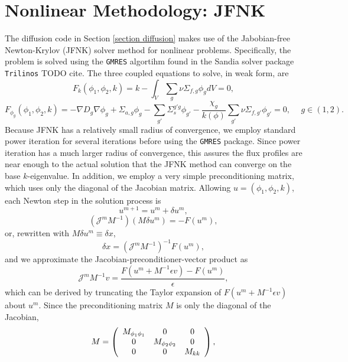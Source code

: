 \section{Nonlinear Methodology: JFNK}
The diffusion code in Section \ref{section diffusion} makes use of the Jabobian-free Newton-Krylov (JFNK) solver method for nonlinear problems.  Specifically, the problem is solved using the \texttt{GMRES} algortihm found in the Sandia solver package \texttt{Trilinos} TODO cite.  The three coupled equations to solve, in weak form, are
\begin{equation}
F_k(\phi_1,\phi_2,k)=k-\int_V \sum_g \nu\Sigma_{f,g}\phi_g dV=0,
\end{equation} \nobreak
\begin{equation}
F_{\phi_g}(\phi_1,\phi_2,k)=-\nabla D_g\nabla\phi_g+\Sigma_{a,g}\phi_g - \sum_{g'}\Sigma_s^{g'g}\phi_{g'}-\frac{\chi_g}{k(\phi)}\sum_{g'}\nu\Sigma_{f,g'}\phi_{g'}=0, \hspace{15pt}g\in(1,2).
\end{equation}
Because JFNK has a relatively small radius of convergence, we employ standard power iteration for several iterations before using the \texttt{GMRES} package.  Since power iteration has a much larger radius of convergence, this assures the flux profiles are near enough to the actual solution that the JFNK method can converge on the base $k$-eigenvalue.  In addition, we employ a very simple preconditioning matrix, which uses only the diagonal of the Jacobian matrix.  Allowing $u=(\phi_1,\phi_2,k)$, each Newton step in the solution process is
\begin{equation}
u^{m+1}=u^m+\delta u^m,
\end{equation}
\begin{equation}
(\mathcal{J}^mM^{-1})(M\delta u^m)=-F(u^m),
\end{equation}
or, rewritten with $M\delta u^m\equiv\delta x$,
\begin{equation}
\delta x=(\mathcal{J}^mM^{-1})^{-1}F(u^m),
\end{equation}
and we approximate the Jacobian-preconditioner-vector product as
\begin{equation}
\mathcal{J}^mM^{-1}v=\frac{F(u^m+M^{-1}\epsilon v)-F(u^m)}{\epsilon},
\end{equation}
which can be derived by truncating the Taylor expansion of $F(u^m+M^{-1}\epsilon v)$ about $u^m$.  Since the preconditioning matrix $M$ is only the diagonal of the Jacobian,
\begin{equation}
M=\left(\begin{array}{c c c}
M_{\phi_1\phi_1} & 0 & 0\\
0 & M_{\phi_2\phi_2} & 0 \\
0 & 0 & M_{kk}
\end{array}\right),
\end{equation}
